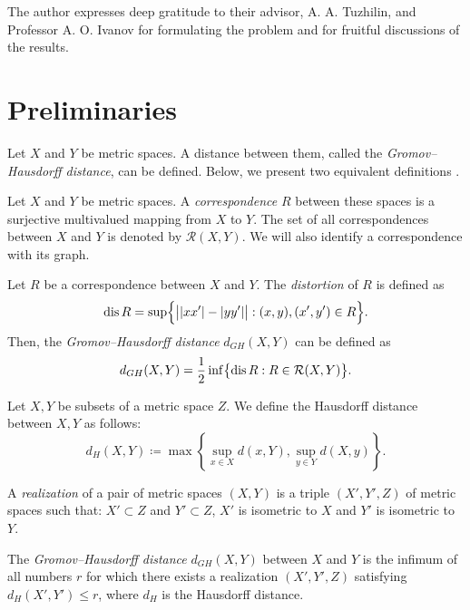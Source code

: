\documentclass[leqno]{article}
\begin{document}
The author expresses deep gratitude to their advisor, A. A. Tuzhilin, and Professor A. O. Ivanov for formulating the problem and for fruitful discussions of the results. 

\section{Preliminaries}

Let $ X $ and $ Y $ be metric spaces. A distance between them, called the \emph{Gromov--Hausdorff distance}, can be defined. Below, we present two equivalent definitions \cite{Lectures}.

\begin{defin}  
Let $ X $ and $ Y $ be metric spaces. A \emph{correspondence} $ R $ between these spaces is a surjective multivalued mapping from $ X $ to $ Y $. The set of all correspondences between $ X $ and $ Y $ is denoted by $ \mathcal{R}(X,Y) $. We will also identify a correspondence with its graph.  
\end{defin}

\begin{defin}  
Let $ R $ be a correspondence between $ X $ and $ Y $. The \emph{distortion} of $ R $ is defined as  
$$
\operatorname{dis}{R} = \sup \Bigl\{ \big| |xx'| - |yy'| \big| : (x, y), (x', y') \in R \Bigr\}.  
$$  
Then, the \emph{Gromov--Hausdorff distance} $ d_{GH}(X,Y) $ can be defined as  
$$
d_{GH}(X,Y) = \frac{1}{2} \inf \bigl\{ \operatorname{dis}{R} : R \in \mathcal{R}(X,Y) \bigr\}.  
$$  
\label{defSootvet}  
\end{defin}
\begin{defin}
  Let $X,Y$ be subsets of a metric space $Z$. We define the Hausdorff distance between $X,Y$ as follows:
  $$
  d_H(X, Y) \coloneqq \max \left\{ \sup_{x \in X} d(x, Y), \sup_{y \in Y} d(X, y) \right\}.
  $$
\end{defin}
\begin{defin}  
A \emph{realization} of a pair of metric spaces $ (X,Y) $ is a triple $ (X', Y', Z) $ of metric spaces such that:  
$ X' \subset Z $ and $ Y' \subset Z $,  
$ X' $ is isometric to $ X $ and 
$ Y' $ is isometric to $ Y $.  

The \emph{Gromov--Hausdorff distance} $ d_{GH}(X,Y) $ between $ X $ and $ Y $ is the infimum of all numbers $ r $ for which there exists a realization $ (X', Y', Z) $ satisfying $ d_H(X', Y') \leq r $, where $ d_H $ is the Hausdorff distance.  
\end{defin}  
\end{document}
